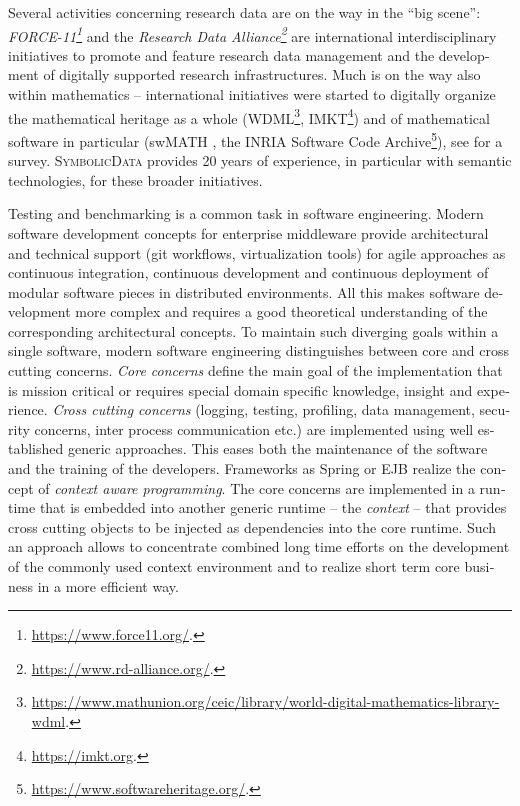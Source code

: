 \documentclass[11pt]{article}
\def\SD{\textsc{SymbolicData}}
\begin{document}
\begin{otherlanguage}{english}
\begin{multicols}{2}
Several activities concerning research data are on the way in the ``big
scene'': \emph{FORCE-11\footnote{\url{https://www.force11.org/}.}} and the
\emph{Research Data Alliance\footnote{\url{https://www.rd-alliance.org/}.}}
are international interdisciplinary initiatives to promote and feature research
data management and the development of digitally supported research
infrastructures.  Much is on the way also within mathematics -- international
initiatives were started to digitally organize the mathematical heritage as a
whole
(WDML\footnote{\url{https://www.mathunion.org/ceic/library/world-digital-mathematics-library-wdml}.},
IMKT\footnote{\url{https://imkt.org}.}) and of mathematical software in
particular (swMATH \cite{swmath}, the INRIA Software Code
Archive\footnote{\url{https://www.softwareheritage.org/}.}), see \cite{cca-16}
for a survey.  {\SD} provides 20 years of experience, in particular with
semantic technologies, for these broader initiatives.


Testing and benchmarking is a common task in software engineering. Modern
software development concepts for enterprise middleware provide architectural
and technical support (git workflows, virtualization tools) for agile
approaches as continuous integration, continuous development and continuous
deployment of modular software pieces in distributed environments.  All this
makes software development more complex and requires a good theoretical
understanding of the corresponding architectural concepts.  To maintain such
diverging goals within a single software, modern software engineering
distinguishes between core and cross cutting concerns. \emph{Core concerns}
define the main goal of the implementation that is mission critical or requires
special domain specific knowledge, insight and experience. \emph{Cross cutting
  concerns} (logging, testing, profiling, data management, security concerns,
inter process communication etc.) are implemented using well established generic
approaches.  This eases both the maintenance of the software and the training
of the developers. Frameworks as Spring or EJB realize the concept of
\emph{context aware programming}.  The core concerns are implemented in a
runtime that is embedded into another generic runtime -- the \emph{context} --
that provides cross cutting objects to be injected as dependencies into the
core runtime.  Such an approach allows to concentrate combined long time
efforts on the development of the commonly used context environment and to
realize short term core business in a more efficient way.


\end{multicols}
\end{otherlanguage}
\end{document}
